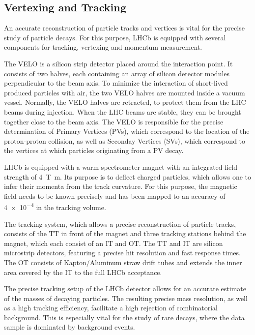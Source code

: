 
\subsection{Vertexing and Tracking}

An accurate reconstruction of particle tracks and vertices is vital for the precise study of particle decays.
For this purpose, LHCb is equipped with several components for tracking, vertexing and momentum measurement.

The \gls{VELO} is a silicon strip detector placed around the interaction point.
It consists of two halves, each containing an array of silicon detector modules perpendicular to the beam axis.
To minimize the interaction of short-lived produced particles with air, the two \gls{VELO} halves are mounted inside a vacuum vessel.
Normally, the \gls{VELO} halves are retracted, to protect them from the LHC beams during injection.
When the LHC beams are stable, they can be brought together close to the beam axis.
The \gls{VELO} is responsible for the precise determination of Primary Vertices (PVs), which correspond to the location of the proton-proton collision, as well as Seconday Vertices (SVs), which correspond to the vertices at which particles originating from a PV decay.

LHCb is equipped with a warm spectrometer magnet with an integrated field strength of \SI{4}{\tesla\metre}.
Its purpose is to deflect charged particles, which allows one to infer their momenta from the track curvature.
For this purpose, the magnetic field needs to be known precisely and has been mapped to an accuracy of \num{4e-4} in the tracking volume.

The tracking system, which allows a precise reconstruction of particle tracks, consists of the \gls{TT} in front of the magnet and three tracking stations behind the magnet, which each consist of an \gls{IT} and \gls{OT}.
The \gls{TT} and \gls{IT} are silicon microstrip detectors, featuring a precise hit resolution and fast response times.
The \gls{OT} consists of Kapton/Aluminum straw drift tubes and extends the inner area covered by the \gls{IT} to the full LHCb acceptance.

The precise tracking setup of the LHCb detector allows for an accurate estimate of the masses of decaying particles.
The resulting precise mass resolution, as well as a high tracking efficiency, facilitate a high rejection of combinatorial background.
This is especially vital for the study of rare decays, where the data sample is dominated by background events.

